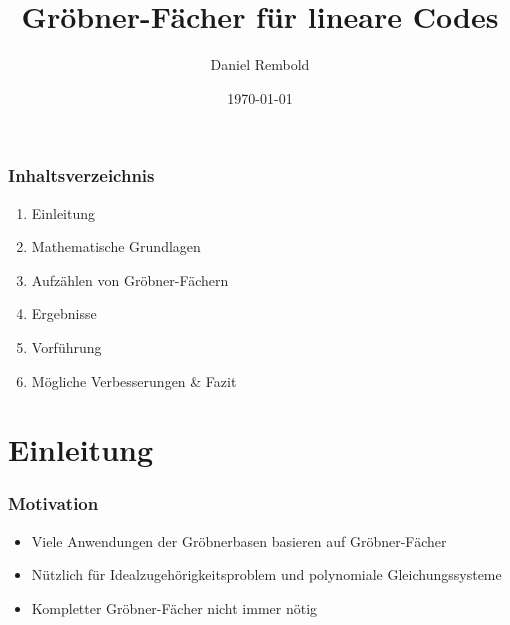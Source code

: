 \documentclass{beamer}
\title[Gröbner-Fächer für lineare Codes]{Gröbner-Fächer für lineare Codes}
\author{Daniel Rembold}
\institute[TUHH]
{
Technische Universit{\"a}t Hamburg Harburg \\
\medskip
{\emph{daniel.rembold@tuhh.de}}
}
\date{\today}
\begin{document}
%
\begin{frame}
\titlepage
\end{frame}
%

\begin{frame}
\frametitle{Inhaltsverzeichnis}

\begin{enumerate}
			\item Einleitung \\

	      	\item Mathematische Grundlagen \\
	      	
	      	\item Aufzählen von Gröbner-Fächern  \\ 
	      		
	      	\item Ergebnisse  \\ 
	      	
	      	\item Vorführung  \\
	  
	      	\item Mögliche Verbesserungen \& Fazit 

		    
\end{enumerate}

\end{frame}

\section{Einleitung}



\begin{frame}[<+->]
\frametitle{Motivation}

\begin{itemize}
\item
Viele Anwendungen der Gröbnerbasen basieren auf Gröbner-Fächer

\item
Nützlich für Idealzugehörigkeitsproblem und polynomiale Gleichungssysteme

\item 
Kompletter Gröbner-Fächer nicht immer nötig


\end{itemize}






\end{frame}
\end{document}
